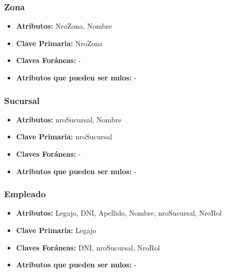 \documentclass[a4paper,11pt]{article}
\begin{document}
\subsubsection{Zona}

\begin{itemize}

	\item \textbf{Atributos:} NroZona, Nombre
	
	\item \textbf{Clave Primaria:} NroZona
	
	\item \textbf{Claves Foráneas:} -

	\item \textbf{Atributos que pueden ser nulos:} -
	
\end{itemize}

\subsubsection{Sucursal}

\begin{itemize}

	\item \textbf{Atributos:} nroSucursal, Nombre
	
	\item \textbf{Clave Primaria:} nroSucursal
	
	\item \textbf{Claves Foráneas:} -

	\item \textbf{Atributos que pueden ser nulos:} -
	
\end{itemize}

\subsubsection{Empleado}

\begin{itemize}

	\item \textbf{Atributos:} Legajo, DNI, Apellido, Nombre, nroSucursal, NroRol
	
	\item \textbf{Clave Primaria:} Legajo
	
	\item \textbf{Claves Foráneas:} DNI, nroSucursal, NroRol

	\item \textbf{Atributos que pueden ser nulos:} -
	
\end{itemize}
\end{document}

